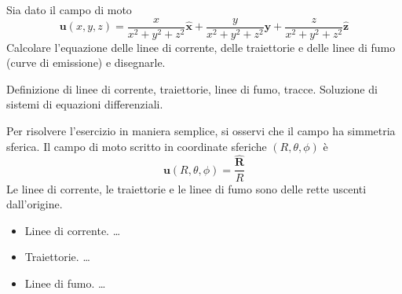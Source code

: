 \begin{exerciseS}
 Sia dato il campo di moto
\begin{equation}
 \bm{u}(x,y,z) = \frac{x}{x^2 + y^2 + z^2} \bm{\hat{x}} +
                 \frac{y}{x^2 + y^2 + z^2} \bm{\hat{y}} +
                 \frac{z}{x^2 + y^2 + z^2} \bm{\hat{z}}
\end{equation}
Calcolare l'equazione delle linee di corrente, delle traiettorie e delle linee di fumo (curve di emissione) e disegnarle.
\end{exerciseS}


\sol

\partone Definizione di linee di corrente, traiettorie, linee di fumo, tracce. Soluzione di sistemi di equazioni differenziali.




\parttwo
Per risolvere l'esercizio in maniera semplice, si osservi che il campo ha simmetria
 sferica. Il campo di moto scritto in coordinate sferiche $(R,\theta,\phi)$ è
 \begin{equation}
   \bm{u}(R,\theta,\phi) = \dfrac{\bm{\hat{R}}}{R}
 \end{equation}
 Le linee di corrente, le traiettorie e le linee di fumo sono delle rette
 uscenti dall'origine.

\begin{itemize}
\item Linee di corrente.
 \dots
\item Traiettorie.
 \dots
\item Linee di fumo.
 \dots

\end{itemize}
